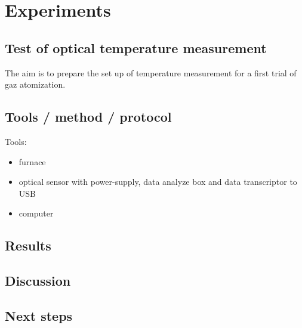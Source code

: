 \section{Experiments}

\subsection{Test of optical temperature measurement}

The aim is to prepare the set up of temperature measurement for a first trial of gaz atomization.


\subsection{Tools / method / protocol}

Tools:
\begin{itemize}
    \item furnace
    \item optical sensor with power-supply, data analyze box and data transcriptor to USB
    \item computer
\end{itemize}

\subsection{Results}

\subsection{Discussion}

\subsection{Next steps}



